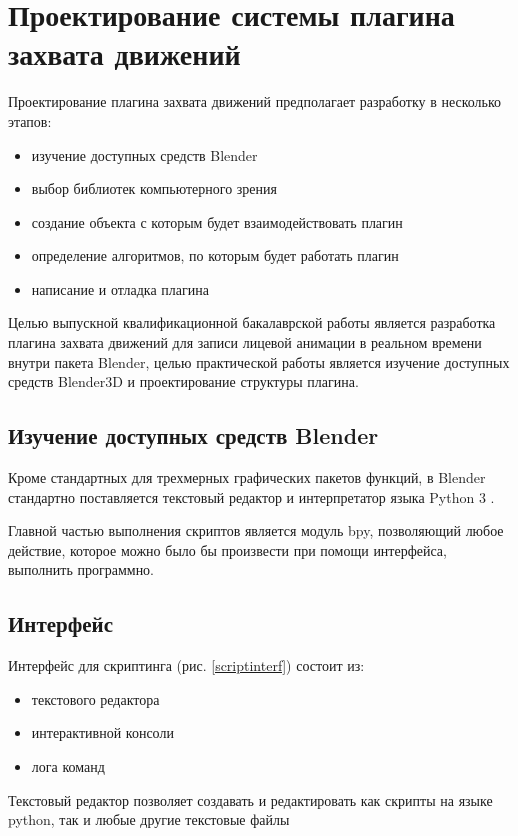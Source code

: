\section{Проектирование системы плагина захвата движений}

Проектирование плагина захвата движений предполагает разработку в несколько этапов:
\begin{itemize}
	\item изучение доступных средств Blender
	\item выбор библиотек компьютерного зрения
	\item создание объекта с которым будет взаимодействовать плагин
	\item определение алгоритмов, по которым будет работать плагин
	\item написание и отладка плагина
\end{itemize}

Целью выпускной квалификационной бакалаврской работы является разработка плагина захвата движений для записи лицевой анимации в реальном времени внутри пакета Blender, целью практической работы является изучение доступных средств Blender3D и проектирование структуры плагина.

\subsection{Изучение доступных средств Blender}

Кроме стандартных для трехмерных графических пакетов функций, в Blender стандартно поставляется текстовый редактор и интерпретатор языка Python 3 \cite{blenderprogbook}.

Главной частью выполнения скриптов является модуль bpy, позволяющий любое действие, которое можно было бы произвести при помощи интерфейса, выполнить программно.

\subsection{Интерфейс}
Интерфейс для скриптинга (рис. \ref{scriptinterf}) состоит из:
\begin{itemize}
	\item текстового редактора
	\item интерактивной консоли
	\item лога команд
\end{itemize}

Текстовый редактор позволяет создавать и редактировать как скрипты на языке python, так и любые другие текстовые файлы

